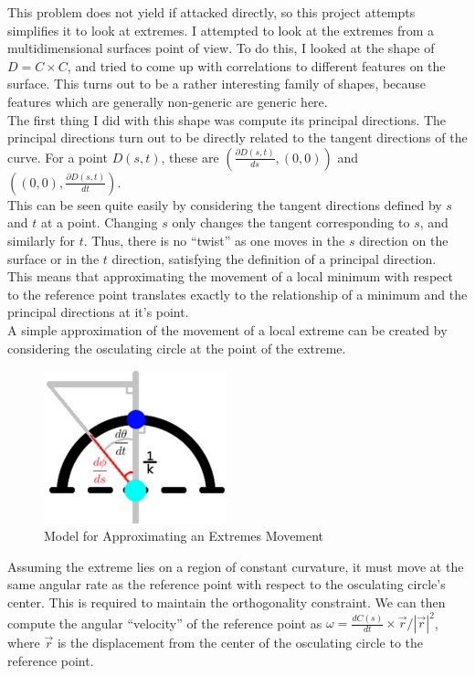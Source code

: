 \documentclass[12pt]{article}
\begin{document}
This problem does not yield if attacked directly, so this project attempts simplifies it to look at extremes.
I attempted to look at the extremes from a multidimensional surfaces point of view.
To do this, I looked at the shape of $D=C\times C$, and tried to come up with correlations to different features on the surface.
This turns out to be a rather interesting family of shapes, because features which are generally non-generic are generic here.\\
The first thing I did with this shape was compute its principal directions.
The principal directions turn out to be directly related to the tangent directions of the curve.
For a point $D(s, t)$, these are $(\frac{\partial D(s, t)}{ds}, (0, 0))$ and $((0, 0), \frac{\partial D(s, t)}{dt})$.\\
This can be seen quite easily by considering the tangent directions defined by $s$ and $t$ at a point.
Changing $s$ only changes the tangent corresponding to $s$, and similarly for $t$.
Thus, there is no ``twist'' as one moves in the $s$ direction on the surface or in the $t$ direction, satisfying the definition of a principal direction.\\
This means that approximating the movement of a local minimum with respect to the reference point translates exactly to the relationship of a minimum and the principal directions at it's point.\\
A simple approximation of the movement of a local extreme can be created by considering the osculating circle at the point of the extreme.
\begin{figure}
\includegraphics[width=200px]{project_osculating_approx.png}
\caption{Model for Approximating an Extremes Movement}
\end{figure}
Assuming the extreme lies on a region of constant curvature, it must move at the same angular rate as the reference point with respect to the osculating circle's center.
This is required to maintain the orthogonality constraint.
We can then compute the angular ``velocity'' of the reference point as $\omega=\frac{dC(s)}{dt}\times \vec{r}/|\vec{r}|^2$, where $\vec{r}$ is the displacement from the center of the osculating circle to the reference point.
\end{document}
